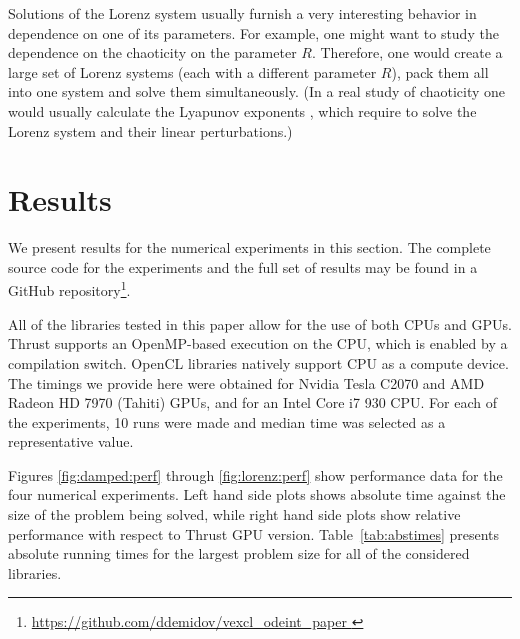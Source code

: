 \documentclass[1p]{elsarticle}
\begin{document}
Solutions of the Lorenz system usually furnish a very interesting
behavior in dependence on one of its parameters.  For example, one
might want to study the dependence on the chaoticity on the parameter
$R$. Therefore, one would create a large set of Lorenz systems (each
with a different parameter $R$), pack them all into one system and
solve them simultaneously. (In a real study of chaoticity one would
usually calculate the Lyapunov exponents \cite{Ott-book-02}, which
require to solve the Lorenz system and their linear perturbations.)





\section{Results}

We present results for the numerical experiments in this section. The complete
source code for the experiments and the full set of results may be found in a
GitHub repository\footnote{ \href{
https://github.com/ddemidov/vexcl_odeint_paper } {
https://github.com/ddemidov/vexcl\_odeint\_paper } }.


All of the libraries tested in this paper allow for the use of both CPUs and
GPUs.  Thrust supports an OpenMP-based execution on the CPU, which is enabled
by a compilation switch. OpenCL libraries natively support CPU as a compute
device.  The timings we provide here were obtained for Nvidia Tesla C2070 and
AMD Radeon HD 7970 (Tahiti) GPUs, and for an Intel Core i7 930 CPU. For each of
the experiments, 10 runs were made and median time was selected as a
representative value.

Figures \ref{fig:damped:perf} through \ref{fig:lorenz:perf} show performance
data for the four numerical experiments. Left hand side plots shows absolute
time against the size of the problem being solved, while right hand side plots
show relative performance with respect to Thrust GPU version.
Table~\ref{tab:abstimes} presents absolute running times for the largest
problem size for all of the considered libraries.
\end{document}
